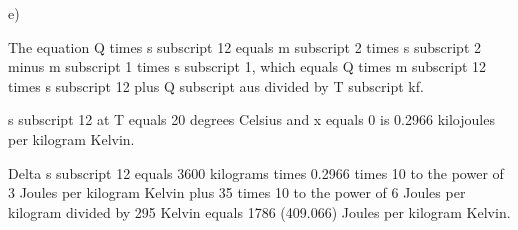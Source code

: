 e)

The equation Q times s subscript 12 equals m subscript 2 times s subscript 2 minus m subscript 1 times s subscript 1, which equals Q times m subscript 12 times s subscript 12 plus Q subscript aus divided by T subscript kf.

s subscript 12 at T equals 20 degrees Celsius and x equals 0 is 0.2966 kilojoules per kilogram Kelvin.

Delta s subscript 12 equals 3600 kilograms times 0.2966 times 10 to the power of 3 Joules per kilogram Kelvin plus 35 times 10 to the power of 6 Joules per kilogram divided by 295 Kelvin equals 1786 (409.066) Joules per kilogram Kelvin.